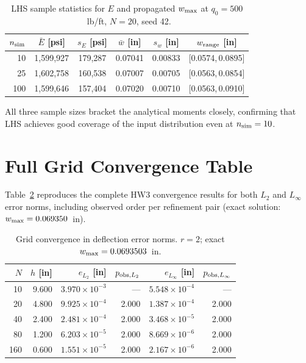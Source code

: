 \documentclass[10pt,twocolumn]{article}
\begin{document}
\begin{table}[h!]
\centering
\caption{LHS sample statistics for $E$ and propagated $w_{\rm max}$
  at $q_0=500$~lb/ft, $N=20$, seed 42.}
\label{tab:lhs}
\footnotesize
\setlength{\tabcolsep}{3pt}
\begin{tabular}{@{}rccccc@{}}
\toprule
$n_{\rm sim}$ & $\bar{E}$ [psi] & $s_E$ [psi] &
  $\bar{w}$ [in] & $s_w$ [in] & $w_{\rm range}$ [in]\\
\midrule
  10 & 1,599,927 & 179,287 & 0.07041 & 0.00833 & [0.0574,\,0.0895]\\
  25 & 1,602,758 & 160,538 & 0.07007 & 0.00705 & [0.0563,\,0.0854]\\
 100 & 1,599,646 & 157,404 & 0.07020 & 0.00710 & [0.0563,\,0.0910]\\
\bottomrule
\end{tabular}
\end{table}

All three sample sizes bracket the analytical moments closely,
confirming that LHS achieves good coverage of the input distribution
even at $n_{\rm sim}=10$.

\section{Full Grid Convergence Table}
\label{app:conv}

Table~\ref{tab:conv_full} reproduces the complete HW3 convergence results
for both $L_2$ and $L_\infty$ error norms, including observed order
per refinement pair (exact solution: $w_{\rm max}=0.069350$~in).

\begin{table}[h!]
\centering
\caption{Grid convergence in deflection error norms.
  $r=2$; exact $w_{{\rm max}}=0.0693503$~in.}
\label{tab:conv_full}
\footnotesize
\setlength{\tabcolsep}{3pt}
\begin{tabular}{@{}rrrrrr@{}}
\toprule
$N$ & $h$ [in] & $e_{L_2}$ [in] & $p_{{\rm obs},L_2}$ & $e_{L_\infty}$ [in] & $p_{{\rm obs},L_\infty}$\\
\midrule
 10 & 9.600 & $3.970{\times}10^{-3}$ & ---   & $5.548{\times}10^{-4}$ & ---  \\
 20 & 4.800 & $9.925{\times}10^{-4}$ & 2.000 & $1.387{\times}10^{-4}$ & 2.000\\
 40 & 2.400 & $2.481{\times}10^{-4}$ & 2.000 & $3.468{\times}10^{-5}$ & 2.000\\
 80 & 1.200 & $6.203{\times}10^{-5}$ & 2.000 & $8.669{\times}10^{-6}$ & 2.000\\
160 & 0.600 & $1.551{\times}10^{-5}$ & 2.000 & $2.167{\times}10^{-6}$ & 2.000\\
\bottomrule
\end{tabular}
\end{table}
\end{document}
